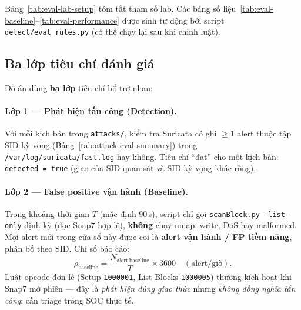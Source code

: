 \documentclass[../main.tex]{subfiles}
\begin{document}
Bảng~\ref{tab:eval-lab-setup} tóm tắt tham số lab. Các bảng số liệu~\ref{tab:eval-baseline}--\ref{tab:eval-performance} được sinh tự động bởi script \texttt{detect/eval\_rules.py} (có thể chạy lại sau khi chỉnh luật).


\subsection{Ba lớp tiêu chí đánh giá}

Đồ án dùng \textbf{ba lớp} tiêu chí bổ trợ nhau:

\paragraph{Lớp 1 — Phát hiện tấn công (Detection).}
Với mỗi kịch bản trong \texttt{attacks/}, kiểm tra Suricata có ghi $\geq 1$ alert thuộc tập SID kỳ vọng (Bảng~\ref{tab:attack-eval-summary}) trong \texttt{/var/log/suricata/fast.log} hay không. Tiêu chí ``đạt'' cho một kịch bản: \texttt{detected = true} (giao của SID quan sát và SID kỳ vọng khác rỗng).

\paragraph{Lớp 2 — False positive vận hành (Baseline).}
Trong khoảng thời gian $T$ (mặc định 90\,s), script chỉ gọi \texttt{scanBlock.py --list-only} định kỳ (đọc Snap7 hợp lệ), \textbf{không} chạy nmap, write, DoS hay malformed. Mọi alert mới trong cửa sổ này được coi là \textbf{alert vận hành / FP tiềm năng}, phân bố theo SID. Chỉ số báo cáo:
\begin{equation}
    \rho_{\mathrm{baseline}} = \frac{N_{\mathrm{alert\,baseline}}}{T} \times 3600 \quad \mathrm{(alert/giờ)}.
\end{equation}
Luật opcode đơn lẻ (Setup \texttt{1000001}, List Blocks \texttt{1000005}) thường kích hoạt khi Snap7 mở phiên --- đây là \emph{phát hiện đúng giao thức} nhưng \emph{không đồng nghĩa tấn công}; cần triage trong SOC thực tế.
\end{document}

